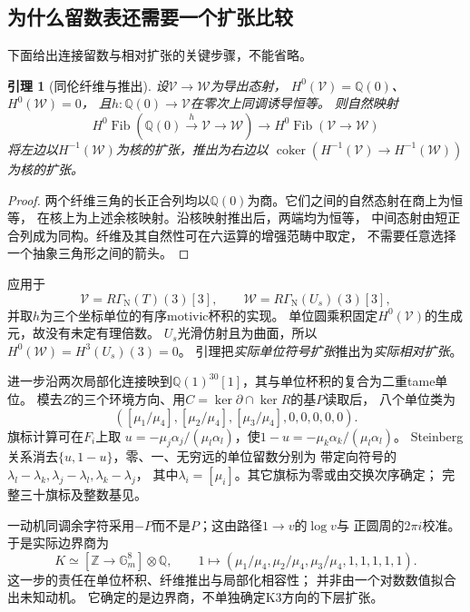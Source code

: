 \documentclass[11pt,a4paper]{ctexart}
\theoremstyle{cnplain}\newtheorem{theorem}{定理}[section]
\newtheorem{lemma}[theorem]{引理}
\theoremstyle{remark}\newtheorem{remark}[theorem]{注}
\newcommand{\Q}{\mathbb Q}\newcommand{\C}{\mathbb C}\newcommand{\Z}{\mathbb Z}
\newcommand{\Gm}{\mathbb G_m}\newcommand{\PP}{\mathbb P}
\newcommand{\Nori}{\mathrm N}\newcommand{\im}{\operatorname{im}}
\newcommand{\coker}{\operatorname{coker}}\newcommand{\rk}{\operatorname{rank}}
\newcommand{\Fib}{\operatorname{Fib}}\newcommand{\Ext}{\operatorname{Ext}}
\begin{document}
\subsection{为什么留数表还需要一个扩张比较}
下面给出连接留数与相对扩张的关键步骤，不能省略。

\begin{lemma}[同伦纤维与推出]\label{lem:fibre}
设$\mathcal V\to\mathcal W$为导出态射，
$H^0(\mathcal V)=\Q(0)$、$H^0(\mathcal W)=0$，
且$h:\Q(0)\to\mathcal V$在零次上同调诱导恒等。
则自然映射
\[
 H^0\Fib(\Q(0)\xrightarrow{h}\mathcal V\to\mathcal W)
 \longrightarrow H^0\Fib(\mathcal V\to\mathcal W)
\]
将左边以$H^{-1}(\mathcal W)$为核的扩张，推出为右边以
$\coker(H^{-1}(\mathcal V)\to H^{-1}(\mathcal W))$为核的扩张。
\end{lemma}
\begin{proof}
两个纤维三角的长正合列均以$\Q(0)$为商。它们之间的自然态射在商上为恒等，
在核上为上述余核映射。沿核映射推出后，两端均为恒等，
中间态射由短正合列成为同构。纤维及其自然性可在六运算的增强范畴中取定，
不需要任意选择一个抽象三角形之间的箭头。
\end{proof}

应用于
\[
 \mathcal V=R\Gamma_\Nori(T)(3)[3],\qquad
 \mathcal W=R\Gamma_\Nori(U_s)(3)[3],
\]
并取$h$为三个坐标单位的有序motivic杯积的实现。
单位圆乘积固定$H^0(\mathcal V)$的生成元，故没有未定有理倍数。
$U_s$光滑仿射且为曲面，所以$H^0(\mathcal W)=H^3(U_s)(3)=0$。
引理把\emph{实际单位符号扩张}推出为\emph{实际相对扩张}。

进一步沿两次局部化连接映到$\Q(1)^{30}[1]$，其与单位杯积的复合为二重tame单位。
模去$Z$的三个环境方向、用$C=\ker\partial\cap\ker R$的基$P$读取后，
八个单位类为
\[
 ([\mu_1/\mu_4],[\mu_2/\mu_4],[\mu_3/\mu_4],0,0,0,0,0).
                                                               \tag{3.3}
\]
旗标计算可在$F_i$上取
$u=-\mu_j\alpha_j/(\mu_l\alpha_l)$，使$1-u=-\mu_k\alpha_k/(\mu_l\alpha_l)$。
Steinberg关系消去$\{u,1-u\}$，零、一、无穷远的单位留数分别为
带定向符号的$\lambda_l-\lambda_k,\lambda_j-\lambda_l,\lambda_k-\lambda_j$，
其中$\lambda_i=[\mu_i]$。其它旗标为零或由交换次序确定；
完整三十旗标及整数基见\cite{Kummer}。

一动机同调余字符采用$-P$而不是$P$；这由路径$1\to v$的$\log v$与
正圆周的$2\pi i$校准。于是实际边界商为
\[
 K\simeq[\Z\longrightarrow\Gm^8]\otimes\Q,\qquad
 1\longmapsto(\mu_1/\mu_4,\mu_2/\mu_4,\mu_3/\mu_4,1,1,1,1,1).
                                                               \tag{3.4}
\]
这一步的责任在单位杯积、纤维推出与局部化相容性；
并非由一个对数数值拟合出未知动机。
它确定的是边界商，不单独确定K3方向的下层扩张。
\end{document}
